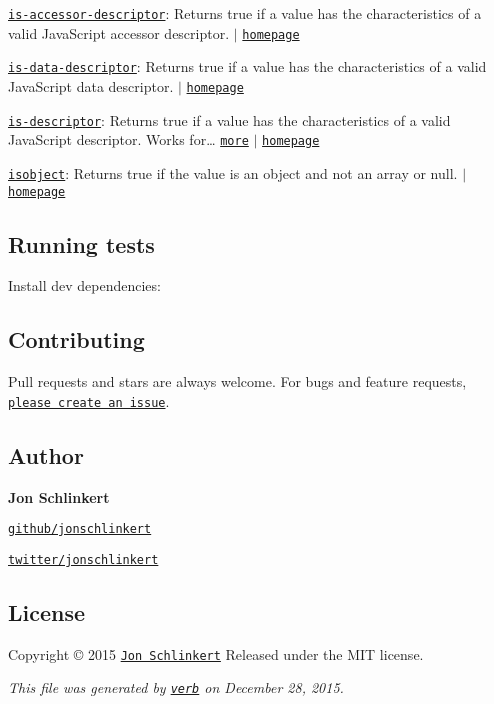 \begin{DoxyItemize}
\item \href{https://www.npmjs.com/package/is-accessor-descriptor}{\tt is-\/accessor-\/descriptor}\+: Returns true if a value has the characteristics of a valid Java\+Script accessor descriptor. $\vert$ \href{https://github.com/jonschlinkert/is-accessor-descriptor}{\tt homepage}
\item \href{https://www.npmjs.com/package/is-data-descriptor}{\tt is-\/data-\/descriptor}\+: Returns true if a value has the characteristics of a valid Java\+Script data descriptor. $\vert$ \href{https://github.com/jonschlinkert/is-data-descriptor}{\tt homepage}
\item \href{https://www.npmjs.com/package/is-descriptor}{\tt is-\/descriptor}\+: Returns true if a value has the characteristics of a valid Java\+Script descriptor. Works for… \href{https://www.npmjs.com/package/is-descriptor}{\tt more} $\vert$ \href{https://github.com/jonschlinkert/is-descriptor}{\tt homepage}
\item \href{https://www.npmjs.com/package/isobject}{\tt isobject}\+: Returns true if the value is an object and not an array or null. $\vert$ \href{https://github.com/jonschlinkert/isobject}{\tt homepage}
\end{DoxyItemize}

\subsection*{Running tests}

Install dev dependencies\+:




\subsection*{Contributing}

Pull requests and stars are always welcome. For bugs and feature requests, \href{https://github.com/jonschlinkert/is-accessor-descriptor/issues/new}{\tt please create an issue}.

\subsection*{Author}

{\bfseries Jon Schlinkert}


\begin{DoxyItemize}
\item \href{https://github.com/jonschlinkert}{\tt github/jonschlinkert}
\item \href{http://twitter.com/jonschlinkert}{\tt twitter/jonschlinkert}
\end{DoxyItemize}

\subsection*{License}

Copyright © 2015 \href{https://github.com/jonschlinkert}{\tt Jon Schlinkert} Released under the M\+IT license.





{\itshape This file was generated by \href{https://github.com/verbose/verb}{\tt verb} on December 28, 2015.} 